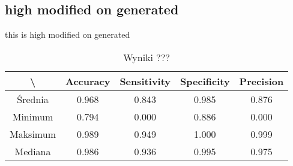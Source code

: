 \subsection{high modified on generated}
this is high modified on generated

\begin{table}[H]
	\centering
	\caption{Wyniki ???}
	\vspace{6pt}
	{\footnotesize
		\begin{tabular}{|c|c|c|c|c|}
      \hline \textbackslash & Accuracy & Sensitivity & Specificity & Precision \\
      \hline Średnia & 0.968 & 0.843 & 0.985 & 0.876 \\
      \hline Minimum & 0.794 & 0.000 & 0.886 & 0.000 \\
      \hline Maksimum & 0.989 & 0.949 & 1.000 & 0.999 \\
      \hline Mediana & 0.986 & 0.936 & 0.995 & 0.975 \\
      \hline
		\end{tabular}
	}
  \vspace{0pt}
  \label{Tab:high_modified_generated_calculated}
\end{table}

